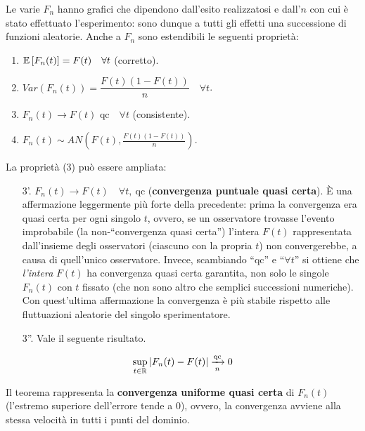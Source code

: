 Le varie $F_n$ hanno grafici che dipendono dall'esito realizzatosi e dall'$n$ con cui è stato effettuato l'esperimento: sono dunque a tutti gli effetti una successione di funzioni aleatorie.
Anche a $F_n$ sono estendibili le seguenti proprietà:
\begin{enumerate}
  \item $\mathbb E \left[ F_n(t) \right]  = F(t) \quad \forall t$ (corretto).
  \item $Var(F_n(t)) = \dfrac{F(t)(1-F(t))} n \quad \forall t$.
  \item $F_n(t) \to F(t) \text{ qc} \quad \forall t$ (consistente).
  \item $F_n(t) \sim AN \left( F(t), \frac{F(t)(1-F(t))} n \right)$. \\
\end{enumerate}
La proprietà (3) può essere ampliata:
\begin{enumerate}
  \item[3'.] $F_n(t) \to F(t) \quad \forall t, \ \text{qc}$ (\textbf{convergenza puntuale quasi certa}).
  È una affermazione leggermente più forte della precedente: prima la convergenza era quasi certa per ogni singolo $t$, ovvero, se un osservatore trovasse l'evento improbabile (la non-``convergenza quasi certa'') l'intera $F(t)$ rappresentata dall'insieme degli osservatori (ciascuno con la propria $t$) non convergerebbe, a causa di quell'unico osservatore.
  Invece, scambiando ``qc'' e ``$\forall t$'' si ottiene che \emph{l'intera} $F(t)$ ha convergenza quasi certa garantita, non solo le singole $F_n(t)$ con $t$ fissato (che non sono altro che semplici successioni numeriche). Con quest'ultima affermazione la convergenza è più stabile rispetto alle fluttuazioni aleatorie del singolo sperimentatore.
  \item[3''.] Vale il seguente risultato.
\end{enumerate}
\begin{teo}
  $$\sup\limits_{t \in \mathbb R} |F_n(t) - F(t)| \xrightarrow[n]{\text{qc}} 0$$
\end{teo}
Il teorema rappresenta la \textbf{convergenza uniforme quasi certa} di $F_n(t)$ (l'estremo superiore dell'errore tende a 0), ovvero, la convergenza avviene alla stessa velocità in tutti i punti del dominio.
